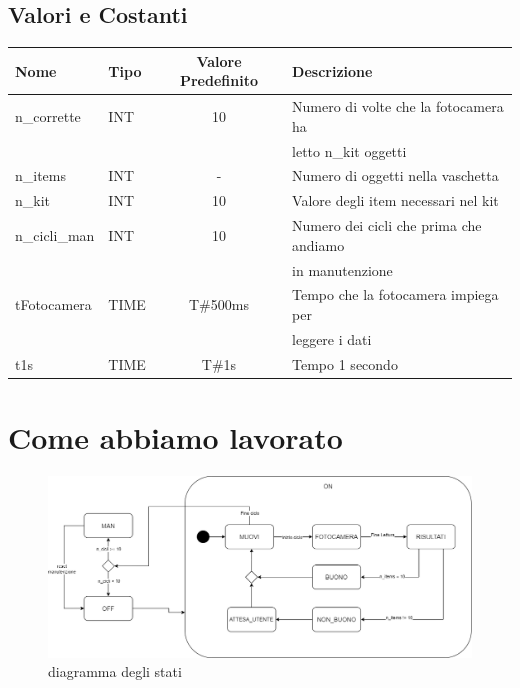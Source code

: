 \documentclass{article}
\begin{document}
\subsection{Valori e Costanti}
\begin{center}
    \begin{tabular}{l l c l}
        \toprule
        \textbf{Nome} & \textbf{Tipo} & \textbf{Valore Predefinito} & \textbf{Descrizione}                   \\
        \midrule
        \midrule

        n\_corrette   & INT           & 10                          & Numero di volte che la fotocamera ha   \\
                      &               &                             & letto n\_kit  oggetti                  \\
        \midrule

        n\_items      & INT           & -                           & Numero di oggetti nella vaschetta      \\
        \midrule

        n\_kit        & INT           & 10                          & Valore degli item necessari nel kit    \\
        \midrule
        n\_cicli\_man & INT           & 10                          & Numero dei cicli che prima che andiamo \\
                      &               &                             & in manutenzione                        \\
        \midrule

        tFotocamera   & TIME          & T\#500ms                    & Tempo che la fotocamera impiega per    \\
                      &               &                             & leggere i dati                         \\
        \midrule
        t1s           & TIME          & T\#1s                       & Tempo 1 secondo                        \\

        \bottomrule
    \end{tabular}
\end{center}

\section{Come abbiamo lavorato}
\begin{figure}[b]
    \centering
    \includegraphics[width = 0.8\linewidth]{Diagramma_Stati.png}
    \caption{diagramma degli stati}
    \label{fig:schema}
\end{figure}
\end{document}
